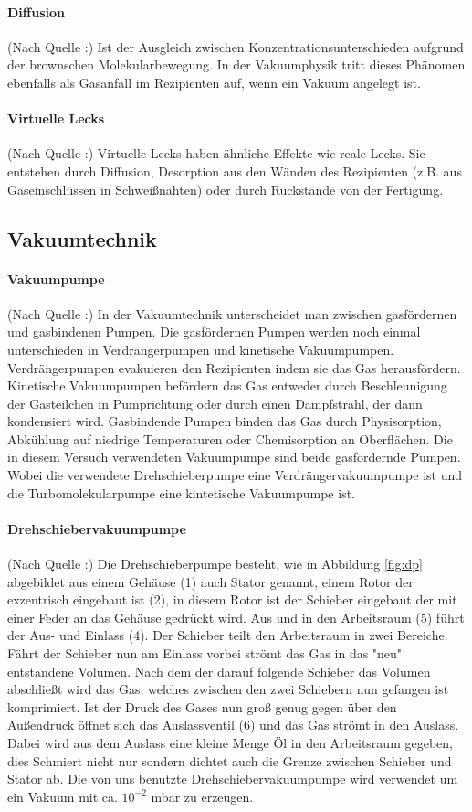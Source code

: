 \paragraph{Diffusion }(Nach Quelle \cite{wiki:dif}:)
Ist der Ausgleich zwischen Konzentrationsunterschieden aufgrund der brownschen Molekularbewegung.
In der Vakuumphysik tritt dieses Phänomen ebenfalls als Gasanfall im Rezipienten auf, wenn
ein Vakuum angelegt ist.
\paragraph{Virtuelle Lecks }(Nach Quelle \cite{wiki:vl}:)
Virtuelle Lecks haben ähnliche Effekte wie reale Lecks. Sie entstehen durch Diffusion, Desorption
aus den Wänden des Rezipienten (z.B. aus Gaseinschlüssen in Schweißnähten) oder durch Rückstände
von der Fertigung.

\subsection{Vakuumtechnik}
\paragraph{Vakuumpumpe }(Nach Quelle \cite{pfeiffer}:)
In der Vakuumtechnik unterscheidet man zwischen gasfördernen und gasbindenen Pumpen. Die
gasfördernen Pumpen werden noch einmal unterschieden
in Verdrängerpumpen und kinetische Vakuumpumpen.
Verdrängerpumpen evakuieren den Rezipienten indem sie das Gas herausfördern. Kinetische
Vakuumpumpen befördern das Gas entweder durch Beschleunigung der Gasteilchen in Pumprichtung oder
durch einen Dampfstrahl, der dann kondensiert wird. Gasbindende Pumpen binden das Gas durch
Physisorption, Abkühlung auf niedrige Temperaturen oder Chemisorption an Oberflächen.
Die in diesem Versuch verwendeten Vakuumpumpe sind beide gasfördernde Pumpen. Wobei
die verwendete Drehschieberpumpe eine Verdrängervakuumpumpe ist und die Turbomolekularpumpe
eine kintetische Vakuumpumpe ist.

\paragraph{Drehschiebervakuumpumpe }(Nach Quelle \cite{pfeiffer}:)
Die Drehschieberpumpe besteht, wie in Abbildung \ref{fig:dp} abgebildet aus einem Gehäuse (1)
auch Stator genannt, einem
Rotor der exzentrisch eingebaut ist (2), in diesem Rotor ist der Schieber eingebaut der mit einer
Feder an das Gehäuse gedrückt wird. Aus und in den Arbeitsraum (5) führt der Aus- und Einlass (4).
Der Schieber teilt den Arbeitsraum in zwei Bereiche. Fährt der Schieber nun am Einlass vorbei
strömt das Gas in das "neu" entstandene Volumen. Nach dem der darauf folgende Schieber das Volumen
abschließt wird das Gas, welches zwischen den zwei Schiebern nun gefangen ist komprimiert.
Ist der Druck des Gases nun groß genug gegen über den Außendruck öffnet sich das Auslassventil (6)
und das Gas strömt in den Auslass. Dabei wird aus dem Auslass eine kleine Menge Öl in den
Arbeitsraum gegeben, dies Schmiert nicht nur sondern dichtet auch die Grenze zwischen Schieber und
Stator ab. Die von uns benutzte Drehschiebervakuumpumpe wird verwendet um ein Vakuum mit ca. 
$10^{-2}$ mbar zu erzeugen.


